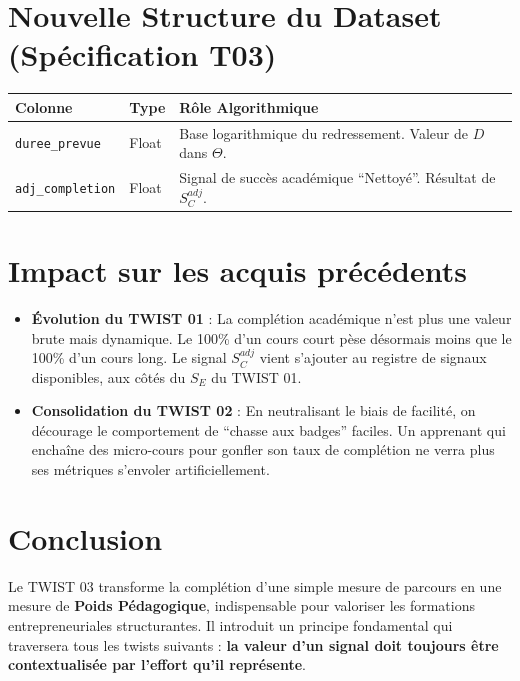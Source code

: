 \documentclass[11pt,a4paper]{article}
\begin{document}
\section{Nouvelle Structure du Dataset (Spécification T03)}
\begin{table}[h!]
\centering
\begin{tabular}{|l|l|p{7cm}|}
\hline
\rowcolor{BrandDark} \color{white} Colonne & \rowcolor{BrandDark} \color{white} Type & \rowcolor{BrandDark} \color{white} Rôle Algorithmique \\ \hline
\texttt{duree\_prevue} & Float & Base logarithmique du redressement. Valeur de $D$ dans $\Theta$. \\ \hline
\rowcolor{BrandPrimary!20} \texttt{adj\_completion} & Float & Signal de succès académique ``Nettoyé''. Résultat de $S_C^{adj}$. \\ \hline
\end{tabular}
\end{table}

\section{Impact sur les acquis précédents}
\begin{itemize}
    \item \textbf{Évolution du TWIST 01} : La complétion académique n'est plus une valeur brute mais dynamique. Le 100\% d'un cours court pèse désormais moins que le 100\% d'un cours long. Le signal $S_C^{adj}$ vient s'ajouter au registre de signaux disponibles, aux côtés du $S_E$ du TWIST 01.
    \item \textbf{Consolidation du TWIST 02} : En neutralisant le biais de facilité, on décourage le comportement de ``chasse aux badges'' faciles. Un apprenant qui enchaîne des micro-cours pour gonfler son taux de complétion ne verra plus ses métriques s'envoler artificiellement.
\end{itemize}

\section{Conclusion}
Le TWIST 03 transforme la complétion d'une simple mesure de parcours en une mesure de \textbf{Poids Pédagogique}, indispensable pour valoriser les formations entrepreneuriales structurantes. Il introduit un principe fondamental qui traversera tous les twists suivants : \textbf{la valeur d'un signal doit toujours être contextualisée par l'effort qu'il représente}.
\end{document}
